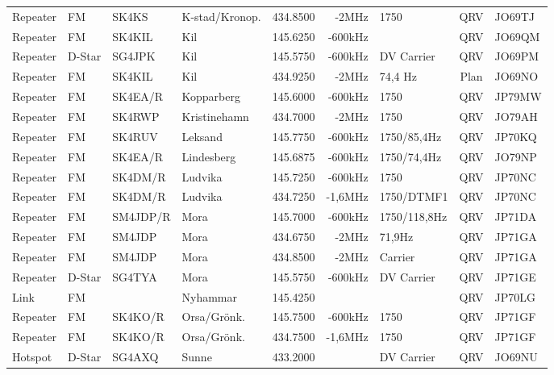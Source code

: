 \begin{landscape}
\begin{longtable}{llllrrlcl}
Repeater & FM     & SK4KS    & K-stad/Kronop.      & 434.8500 & -2MHz      & 1750            & QRV  & JO69TJ \\
Repeater & FM     & SK4KIL   & Kil                 & 145.6250 & -600kHz    &                 & QRV  & JO69QM \\
Repeater & D-Star & SG4JPK   & Kil                 & 145.5750 & -600kHz    & DV Carrier      & QRV  & JO69PM \\
Repeater & FM     & SK4KIL   & Kil                 & 434.9250 & -2MHz      & 74,4 Hz         & Plan & JO69NO \\
Repeater & FM     & SK4EA/R  & Kopparberg          & 145.6000 & -600kHz    & 1750            & QRV  & JP79MW \\
Repeater & FM     & SK4RWP   & Kristinehamn        & 434.7000 & -2MHz      & 1750            & QRV  & JO79AH \\
Repeater & FM     & SK4RUV   & Leksand             & 145.7750 & -600kHz    & 1750/85,4Hz     & QRV  & JP70KQ \\
Repeater & FM     & SK4EA/R  & Lindesberg          & 145.6875 & -600kHz    & 1750/74,4Hz     & QRV  & JO79NP \\
Repeater & FM     & SK4DM/R  & Ludvika             & 145.7250 & -600kHz    & 1750            & QRV  & JP70NC \\
Repeater & FM     & SK4DM/R  & Ludvika             & 434.7250 & -1,6MHz    & 1750/DTMF1      & QRV  & JP70NC \\
Repeater & FM     & SM4JDP/R & Mora                & 145.7000 & -600kHz    & 1750/118,8Hz    & QRV  & JP71DA \\
Repeater & FM     & SM4JDP   & Mora                & 434.6750 & -2MHz      & 71,9Hz          & QRV  & JP71GA \\
Repeater & FM     & SM4JDP   & Mora                & 434.8500 & -2MHz      & Carrier         & QRV  & JP71GA \\
Repeater & D-Star & SG4TYA   & Mora                & 145.5750 & -600kHz    & DV Carrier      & QRV  & JP71GE \\
Link     & FM     &          & Nyhammar            & 145.4250 &            &                 & QRV  & JP70LG \\
Repeater & FM     & SK4KO/R  & Orsa/Grönk.         & 145.7500 & -600kHz    & 1750            & QRV  & JP71GF \\
Repeater & FM     & SK4KO/R  & Orsa/Grönk.         & 434.7500 & -1,6MHz    & 1750            & QRV  & JP71GF \\
Hotspot  & D-Star & SG4AXQ   & Sunne               & 433.2000 &            & DV Carrier      & QRV  & JO69NU \\

\end{longtable}
\end{landscape}
